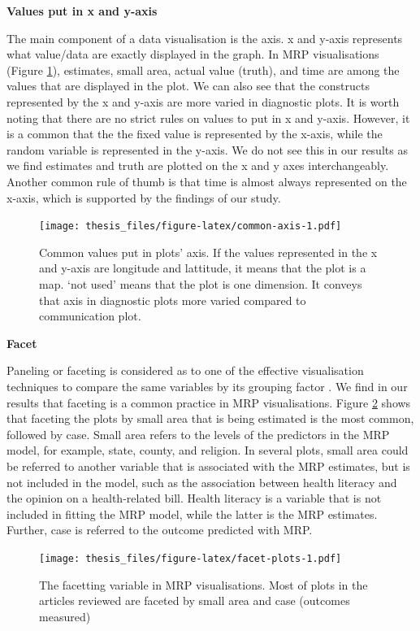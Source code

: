 \documentclass{monashthesis}
\begin{document}
\textbf{Values put in x and y-axis}

The main component of a data visualisation is the axis. x and y-axis represents what value/data are exactly displayed in the graph. In MRP visualisations (Figure \ref{fig:common-axis}), estimates, small area, actual value (truth), and time are among the values that are displayed in the plot. We can also see that the constructs represented by the x and y-axis are more varied in diagnostic plots. It is worth noting that there are no strict rules on values to put in x and y-axis. However, it is a common that the the fixed value is represented by the x-axis, while the random variable is represented in the y-axis. We do not see this in our results as we find estimates and truth are plotted on the x and y axes interchangeably. Another common rule of thumb is that time is almost always represented on the x-axis, which is supported by the findings of our study.

\begin{figure}
\centering
\texttt{[image: thesis\_files/figure-latex/common-axis-1.pdf]}
\caption{\label{fig:common-axis}Common values put in plots' axis. If the values represented in the x and y-axis are longitude and lattitude, it means that the plot is a map. `not used' means that the plot is one dimension. It conveys that axis in diagnostic plots more varied compared to communication plot.}
\end{figure}

\textbf{Facet}

Paneling or faceting is considered as to one of the effective visualisation techniques to compare the same variables by its grouping factor \autocite{MIDWAY2020100141}. We find in our results that faceting is a common practice in MRP visualisations. Figure \ref{fig:facet-plots} shows that faceting the plots by small area that is being estimated is the most common, followed by case. Small area refers to the levels of the predictors in the MRP model, for example, state, county, and religion. In several plots, small area could be referred to another variable that is associated with the MRP estimates, but is not included in the model, such as the association between health literacy and the opinion on a health-related bill. Health literacy is a variable that is not included in fitting the MRP model, while the latter is the MRP estimates. Further, case is referred to the outcome predicted with MRP.

\begin{figure}
\centering
\texttt{[image: thesis\_files/figure-latex/facet-plots-1.pdf]}
\caption{\label{fig:facet-plots}The facetting variable in MRP visualisations. Most of plots in the articles reviewed are faceted by small area and case (outcomes measured)}
\end{figure}
\end{document}
